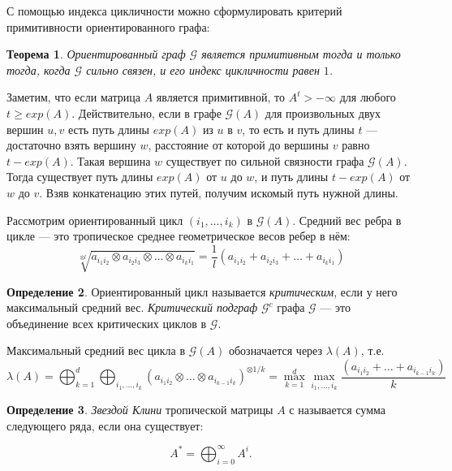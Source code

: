 \documentclass[12pt]{article}
\newtheorem{theorem}{Теорема}[section]
\theoremstyle{definition}
\newtheorem{definition}[theorem]{Определение}
\begin{document}
С помощью индекса цикличности можно сформулировать критерий примитивности ориентированного графа:

\begin{theorem}\cite[теорема 3.4.4]{combinatorialMatrixTheory}
Ориентированный граф $\mathcal{G}$ является примитивным тогда и только тогда, когда $\mathcal{G}$ сильно связен, и его индекс цикличности равен $1$.
\end{theorem}

Заметим, что если матрица $A$ является примитивной, то $A^t > -\infty$ для любого $t \ge exp(A)$. Действительно, если в графе $\mathcal{G}(A)$ для произвольных двух вершин $u, v$ есть путь длины $exp(A)$ из $u$ в $v$, то есть и путь длины $t$ --- достаточно взять вершину $w$, расстояние от которой до вершины $v$ равно $t - exp(A)$. Такая вершина $w$ существует по сильной связности графа $\mathcal{G}(A)$. Тогда существует путь длины $exp(A)$ от $u$ до $w$, и путь длины $t - exp(A)$ от $w$ до $v$. Взяв конкатенацию этих путей, получим искомый путь нужной длины.

Рассмотрим ориентированный цикл $(i_1, \dots, i_k)$ в $\mathcal{G}(A)$. Средний вес ребра в цикле --- это тропическое среднее геометрическое весов ребер в нём:
\begin{equation*}
    \sqrt[\otimes l]{a_{i_1 i_2} \otimes a_{i_2 i_3} \otimes \dots \otimes a_{i_k i_1}}=
    \frac{1}{l}(a_{i_1 i_2} + a_{i_2 i_3} + \dots + a_{i_k i_1})
\end{equation*}

\begin{definition}
Ориентированный цикл называется \textit{критическим}, если у него максимальный средний вес. \textit{Критический подграф} $\mathcal{G}^c$ графа $\mathcal{G}$ --- это объединение всех критических циклов в $\mathcal{G}$.

Максимальный средний вес цикла в $\mathcal{G}(A)$ обозначается через $\lambda(A)$, т.е.
\begin{equation*}
        \lambda(A) = \bigoplus_{k = 1}^d \bigoplus_{i_1, \dots, i_k} (a_{{i_1}{i_2}}\otimes \dots \otimes a_{{i_{k - 1}}{i_k}})^{\otimes{1/k}} = \max_{k = 1}^d \max_{i_1, \dots, i_k} \frac{(a_{{i_1}{i_2}} + \dots + a_{{i_{k - 1}}{i_k}})}{k}
\end{equation*}
\end{definition}

\begin{definition}
\textit{Звездой Клини} тропической матрицы $A$ с называется сумма следующего ряда, если она существует:

\begin{equation}
\label{kleenyEq}
    A^* = \bigoplus_{i = 0}^{\infty} A^i.
\end{equation}
\end{definition}
\end{document}
